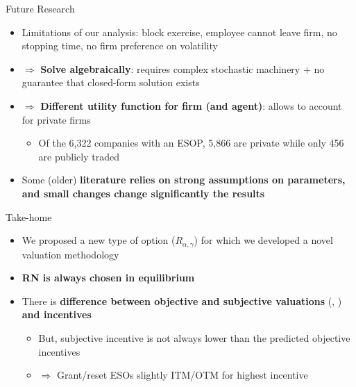 \documentclass[compress]{beamer}
\begin{document}
\begin{frame}{Future Research}
    \begin{itemize}
        \item Limitations of our analysis: block exercise, employee cannot leave firm, no stopping time, no firm preference on volatility
        \pause
        \item $\Rightarrow$ \textbf{Solve algebraically}: requires complex stochastic machinery + no guarantee that closed-form solution exists
        \item $\Rightarrow$ \textbf{Different utility function for firm (and agent)}: allows to account for private firms
        \begin{itemize}
            \item Of the 6,322 companies with an ESOP, 5,866 are private while only 456 are publicly traded \citep{nceoNCEOHome}
        \end{itemize}
        \pause
        \item Some (older) \textbf{literature relies on strong assumptions on parameters, and small changes change significantly the results}
    \end{itemize}
\end{frame}

\begin{frame}{Take-home}
    \begin{itemize}
        \item We proposed a new type of option ($R_{\alpha, \gamma}$) for which we developed a novel valuation methodology
        \pause
        \item  \textbf{RN is always chosen in equilibrium}
        \pause
        \item There is \textbf{difference between objective and subjective valuations} (\citet{meulbroek2001efficiency}, \citet{ingersoll2006valuing}) \textbf{and incentives}
        \begin{itemize}
            \item But, subjective incentive is not always lower than the predicted objective incentives
            \item $\Rightarrow$ Grant/reset ESOs slightly ITM/OTM for highest incentive
        \end{itemize}        
    \end{itemize}
\end{frame}
\end{document}
